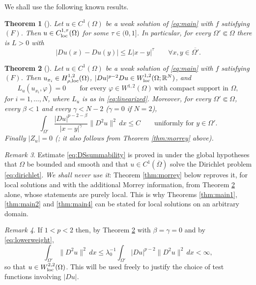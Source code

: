 \documentclass[reqno]{amsart}
\theoremstyle{plain}
\newtheorem{theorem}{Theorem}
\theoremstyle{definition}
\theoremstyle{remark}
\newtheorem{remark}[theorem]{Remark}
\newcommand{\R}{\mathbb{R}}
\begin{document}
We shall use the following known results.

\begin{theorem}[\cite{DiB,Tol,Lie,Teix}]\label{thm:C1alpha}
Let $u\in C^1(\Omega)$ be a weak solution of \eqref{eq:main} with $f$ satisfying $(F)$. Then
$u\in C^{1,\tau}_{\rm loc}(\Omega)$ for some $\tau\in(0,1]$. In particular, for every
$\Omega'\Subset\Omega$ there is $L>0$ with
\begin{equation}\label{eq:holder}
|Du(x)-Du(y)|\le L|x-y|^{\tau}\qquad \forall x,y\in\overline{\Omega'} .
\end{equation}
\end{theorem}

\begin{theorem}[{\cite[Theorem 1.1 and (1.2)]{DS1}}]\label{thm:DSlin}
Let $u\in C^1(\Omega)$ be a weak solution of \eqref{eq:main} with $f$ satisfying $(F)$. Then
$u_{x_i}\in H^{1,2}_{\rho,\rm loc}(\Omega)$, $|Du|^{p-2}Du\in W^{1,2}_{\rm loc}(\Omega;\R^N)$, and
\begin{equation}\label{eq:linear-eq}
L_u(u_{x_i},\varphi)=0\qquad\text{for every }\varphi\in W^{1,2}(\Omega)\ \text{with compact support in }\Omega,
\end{equation}
for $i=1,\dots,N$, where $L_u$ is as in \eqref{eq:linearized}. Moreover, for every
$\Omega'\Subset\Omega$, every $\beta<1$ and every $\gamma<N-2$ ($\gamma=0$ if $N=2$),
\[
\int_{\Omega'}\frac{|Du|^{p-2-\beta}}{|x-y|^\gamma}\|D^2u\|^2\,dx\le C
\qquad\text{uniformly for }y\in\Omega' .
\]
Finally $|Z_u|=0$ \emph{(\cite{Lou}; it also follows from Theorem \ref{thm:morrey} above)}.
\end{theorem}

\begin{remark}\label{rem:global}
Estimate \eqref{eq:DSsummability} is proved in \cite[Theorem 1.1]{DS1} under the global hypotheses
that $\Omega$ be bounded and smooth and that $u\in C^1(\overline\Omega)$ solve the Dirichlet problem
\eqref{eq:dirichlet}. \emph{We shall never use it}: Theorem \ref{thm:morrey} below reproves it, for
local solutions and with the additional Morrey information, from Theorem \ref{thm:DSlin} alone,
whose statements are purely local. This is why Theorems \ref{thm:main1}, \ref{thm:main2} and
\ref{thm:main4} can be stated for local solutions on an arbitrary domain.
\end{remark}

\begin{remark}\label{rem:W22}
If $1<p<2$ then, by Theorem \ref{thm:DSlin} with $\beta=\gamma=0$ and by \eqref{eq:lowerweight},
\[
\int_{\Omega'}\|D^2u\|^2\,dx\le\lambda_0^{-1}\int_{\Omega'}|Du|^{p-2}\|D^2u\|^2\,dx<\infty ,
\]
so that $u\in W^{2,2}_{\rm loc}(\Omega)$. This will be used freely to justify the choice of test
functions involving $|Du|$.
\end{remark}
\end{document}

